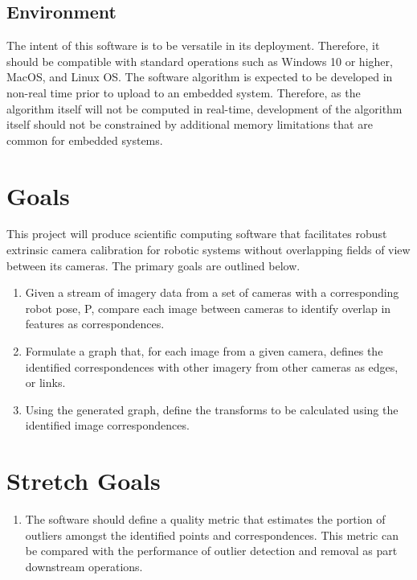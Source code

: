 \documentclass{article}
\begin{document}
\subsection{Environment}
The intent of this software is to be versatile in its deployment. Therefore, 
it should be compatible with standard operations such as Windows 10 or higher, 
MacOS, and Linux OS.
\newline
\newline
The software algorithm is expected to be developed in non-real time prior to 
upload to an embedded system. Therefore, as the algorithm itself will not be 
computed in real-time, development of the algorithm itself should not be 
constrained by additional memory limitations that are common for embedded 
systems.

\section{Goals}
This project will produce scientific computing software that facilitates 
robust extrinsic camera calibration for robotic systems without overlapping 
fields of view between its cameras. The primary goals are outlined below.

\begin{enumerate}
    \item Given a stream of imagery data from a set of cameras with a 
    corresponding robot pose, P, compare each image 
    between cameras to identify overlap in features as correspondences.

    \item Formulate a graph that, for each image from a given camera, defines 
    the identified correspondences with other imagery from other cameras as 
    edges, or links.

    \item Using the generated graph, define the transforms to be calculated 
    using the identified image correspondences. 
\end{enumerate}

\section{Stretch Goals}
\begin{enumerate}
    \item The software should define a quality metric that estimates the 
    portion of outliers amongst the identified points and correspondences. 
    This metric can be compared with the performance of outlier detection 
    and removal as part downstream operations.
\end{enumerate}
\end{document}
